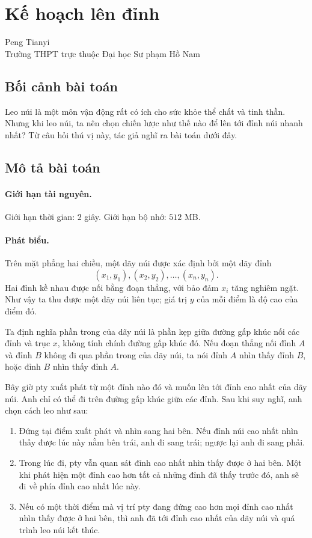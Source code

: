 \documentclass[11pt]{article}
\begin{document}
\section{Kế hoạch lên đỉnh}

\begin{center}
Peng Tianyi\\
Trường THPT trực thuộc Đại học Sư phạm Hồ Nam
\end{center}

\subsection{Bối cảnh bài toán}

Leo núi là một môn vận động rất có ích cho sức khỏe thể chất và tinh thần.
Nhưng khi leo núi, ta nên chọn chiến lược như thế nào để lên tới đỉnh núi
nhanh nhất? Từ câu hỏi thú vị này, tác giả nghĩ ra bài toán dưới đây.

\subsection{Mô tả bài toán}

\paragraph{Giới hạn tài nguyên.}
Giới hạn thời gian: \(2\) giây. Giới hạn bộ nhớ: \(512\) MB.

\paragraph{Phát biểu.}
Trên mặt phẳng hai chiều, một dãy núi được xác định bởi một dãy đỉnh
\[
  (x_1,y_1),(x_2,y_2),\ldots,(x_n,y_n).
\]
Hai đỉnh kề nhau được nối bằng đoạn thẳng, với bảo đảm \(x_i\) tăng nghiêm
ngặt. Như vậy ta thu được một dãy núi liên tục; giá trị \(y\) của mỗi điểm là
độ cao của điểm đó.

Ta định nghĩa phần trong của dãy núi là phần kẹp giữa đường gấp khúc nối các
đỉnh và trục \(x\), không tính chính đường gấp khúc đó. Nếu đoạn thẳng nối
đỉnh \(A\) và đỉnh \(B\) không đi qua phần trong của dãy núi, ta nói đỉnh
\(A\) nhìn thấy đỉnh \(B\), hoặc đỉnh \(B\) nhìn thấy đỉnh \(A\).

Bây giờ pty xuất phát từ một đỉnh nào đó và muốn lên tới đỉnh cao nhất của
dãy núi. Anh chỉ có thể đi trên đường gấp khúc giữa các đỉnh. Sau khi suy
nghĩ, anh chọn cách leo như sau:
\begin{enumerate}
  \item Đứng tại điểm xuất phát và nhìn sang hai bên. Nếu đỉnh núi cao nhất
  nhìn thấy được lúc này nằm bên trái, anh đi sang trái; ngược lại anh đi
  sang phải.
  \item Trong lúc đi, pty vẫn quan sát đỉnh cao nhất nhìn thấy được ở hai
  bên. Một khi phát hiện một đỉnh cao hơn tất cả những đỉnh đã thấy trước
  đó, anh sẽ đi về phía đỉnh cao nhất lúc này.
  \item Nếu có một thời điểm mà vị trí pty đang đứng cao hơn mọi đỉnh cao
  nhất nhìn thấy được ở hai bên, thì anh đã tới đỉnh cao nhất của dãy núi và
  quá trình leo núi kết thúc.
\end{enumerate}
\end{document}
